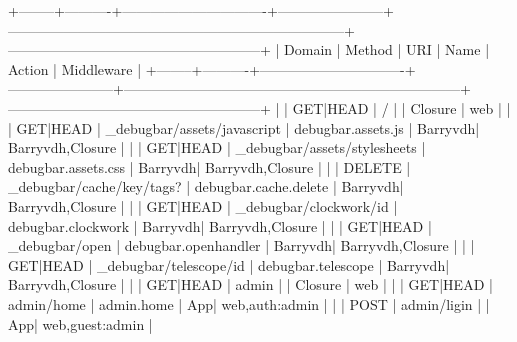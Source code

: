 +--------+----------+-------------------------------+-----------------------+------------------------------------------------------------------------+------------------------------------------------------+
| Domain | Method   | URI                           | Name                  | Action                                                                 | Middleware                                           |
+--------+----------+-------------------------------+-----------------------+------------------------------------------------------------------------+------------------------------------------------------+
|        | GET|HEAD | /                             |                       | Closure                                                                | web                                                  |
|        | GET|HEAD | _debugbar/assets/javascript   | debugbar.assets.js    | Barryvdh\Debugbar\Controllers\AssetController@js                       | Barryvdh\Debugbar\Middleware\DebugbarEnabled,Closure |
|        | GET|HEAD | _debugbar/assets/stylesheets  | debugbar.assets.css   | Barryvdh\Debugbar\Controllers\AssetController@css                      | Barryvdh\Debugbar\Middleware\DebugbarEnabled,Closure |
|        | DELETE   | _debugbar/cache/{key}/{tags?} | debugbar.cache.delete | Barryvdh\Debugbar\Controllers\CacheController@delete                   | Barryvdh\Debugbar\Middleware\DebugbarEnabled,Closure |
|        | GET|HEAD | _debugbar/clockwork/{id}      | debugbar.clockwork    | Barryvdh\Debugbar\Controllers\OpenHandlerController@clockwork          | Barryvdh\Debugbar\Middleware\DebugbarEnabled,Closure |
|        | GET|HEAD | _debugbar/open                | debugbar.openhandler  | Barryvdh\Debugbar\Controllers\OpenHandlerController@handle             | Barryvdh\Debugbar\Middleware\DebugbarEnabled,Closure |
|        | GET|HEAD | _debugbar/telescope/{id}      | debugbar.telescope    | Barryvdh\Debugbar\Controllers\TelescopeController@show                 | Barryvdh\Debugbar\Middleware\DebugbarEnabled,Closure |
|        | GET|HEAD | admin                         |                       | Closure                                                                | web                                                  |
|        | GET|HEAD | admin/home                    | admin.home            | App\Http\Controllers\Admin\HomeController@index                        | web,auth:admin                                       |
|        | POST     | admin/ligin                   |                       | App\Http\Controllers\Admin\Auth\LoginController@login                  | web,guest:admin                                      |

